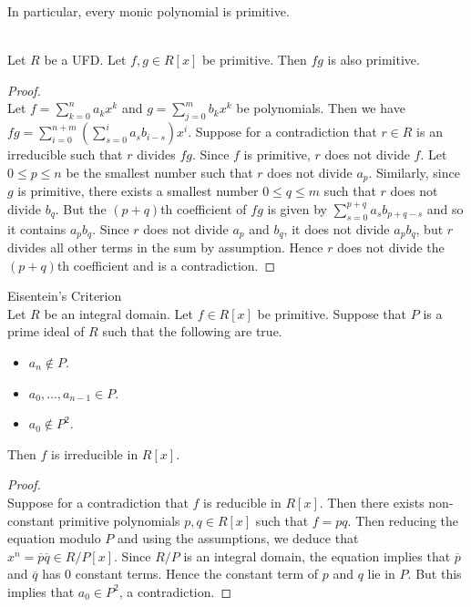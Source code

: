\documentclass[a4paper]{article}
\begin{document}
In particular, every monic polynomial is primitive. 

\begin{lmm}{}{}\\
Let $R$ be a UFD. Let $f,g\in R[x]$ be primitive. Then $fg$ is also primitive. 
\begin{proof}\\
Let $f=\sum_{k=0}^na_kx^k$ and $g=\sum_{j=0}^mb_kx^k$ be polynomials. Then we have $fg=\sum_{i=0}^{n+m}\left(\sum_{s=0}^ia_sb_{i-s}\right)x^i$. Suppose for a contradiction that $r\in R$ is an irreducible such that $r$ divides $fg$. Since $f$ is primitive, $r$ does not divide $f$. Let $0\leq p\leq n$ be the smallest number such that $r$ does not divide $a_p$. Similarly, since $g$ is primitive, there exists a smallest number $0\leq q\leq m$ such that $r$ does not divide $b_q$. But the $(p+q)$th coefficient of $fg$ is given by $\sum_{s=0}^{p+q}a_sb_{p+q-s}$ and so it contains $a_pb_q$. Since $r$ does not divide $a_p$ and $b_q$, it does not divide $a_pb_q$, but $r$ divides all other terms in the sum by assumption. Hence $r$ does not divide the $(p+q)$th coefficient and is a contradiction. 
\end{proof}
\end{lmm}

\begin{thm}{Eisentein's Criterion}{}\\
Let $R$ be an integral domain. Let $f\in R[x]$ be primitive. Suppose that $P$ is a prime ideal of $R$ such that the following are true. 
\begin{itemize}
\item $a_n\notin P$. 
\item $a_0,\dots,a_{n-1}\in P$. 
\item $a_0\notin P^2$. 
\end{itemize}
Then $f$ is irreducible in $R[x]$. 
\begin{proof}\\
Suppose for a contradiction that $f$ is reducible in $R[x]$. Then there exists non-constant primitive polynomials $p,q\in R[x]$ such that $f=pq$. Then reducing the equation modulo $P$ and using the assumptions, we deduce that $x^n=\overline{p}\overline{q}\in R/P[x]$. Since $R/P$ is an integral domain, the equation implies that $\overline{p}$ and $\overline{q}$ has $0$ constant terms. Hence the constant term of $p$ and $q$ lie in $P$. But this implies that $a_0\in P^2$, a contradiction. 
\end{proof}
\end{thm}
\end{document}
